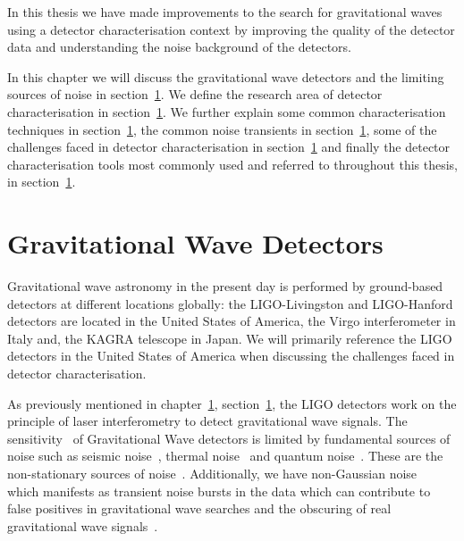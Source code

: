



In this thesis we have made improvements to the search for gravitational waves using a detector characterisation context by improving the quality of the detector data and understanding the noise background of the detectors. 

In this chapter we will discuss the gravitational wave detectors and the limiting sources of noise in section~\ref{}. We define the research area of detector characterisation in section~\ref{}. We further explain some common characterisation techniques in section~\ref{}, the common noise transients in section~\ref{}, some of the challenges faced in detector characterisation in section~\ref{} and finally the detector characterisation tools most commonly used and referred to throughout this thesis, in section~\ref{}.

\section{\label{3:sec:gw_detectors}Gravitational Wave Detectors}

Gravitational wave astronomy in the present day is performed by ground-based detectors at different locations globally: the LIGO-Livingston and LIGO-Hanford detectors are located in the United States of America, the Virgo interferometer in Italy and, the KAGRA telescope in Japan. We will primarily reference the LIGO detectors in the United States of America when discussing the challenges faced in detector characterisation. 

As previously mentioned in chapter~\ref{}, section~\ref{}, the LIGO detectors work on the principle of laser interferometry to detect gravitational wave signals. The sensitivity~\cite{aLIGO_design_curve:2018} of Gravitational Wave detectors is limited by fundamental sources of noise such as seismic noise~\cite{Glanzer:2023}, thermal noise~\cite{thermal_noise:2018} and quantum noise~\cite{quantum_noise:2003}. These are the non-stationary sources of noise~\cite{PSD_var:2020}. Additionally, we have non-Gaussian noise~\cite{Noise_Guide:2020} which manifests as transient noise bursts in the data which can contribute to false positives in gravitational wave searches and the obscuring of real gravitational wave signals~\cite{GW170817:2017, GW150914_noise:2016}.

